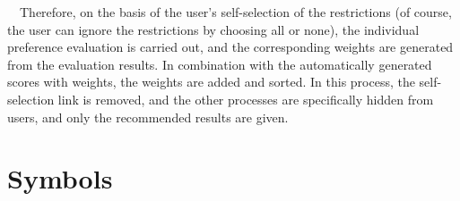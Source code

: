 \documentclass[12pt]{article}
\begin{document}
~~Therefore, on the basis of the user's self-selection of the restrictions (of course, the user can ignore the restrictions by choosing all or none), the individual preference evaluation is carried out, and the corresponding weights are generated from the evaluation results. In combination with the automatically generated scores with weights, the weights are added and sorted. In this process, the self-selection link is removed, and the other processes are specifically hidden from users, and only the recommended results are given.


\section{Symbols}
\end{document}
